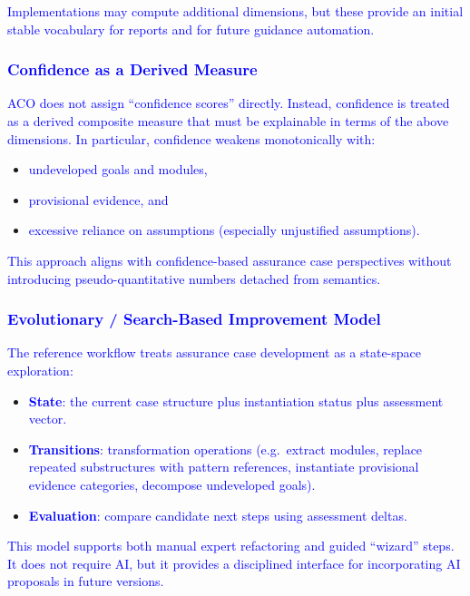 \documentclass[11pt]{article}
\begin{document}
\textcolor{blue}{Implementations may compute additional dimensions, but these provide an initial stable vocabulary for reports and for future guidance automation.}

\subsubsection{\textcolor{blue}{Confidence as a Derived Measure}}

\textcolor{blue}{ACO does not assign ``confidence scores'' directly. Instead, confidence is treated as a derived composite measure that must be explainable in terms of the above dimensions. In particular, confidence weakens monotonically with:}
\begin{itemize}[leftmargin=2em]
  \item \textcolor{blue}{undeveloped goals and modules,}
  \item \textcolor{blue}{provisional evidence, and}
  \item \textcolor{blue}{excessive reliance on assumptions (especially unjustified assumptions).}
\end{itemize}

\textcolor{blue}{This approach aligns with confidence-based assurance case perspectives without introducing pseudo-quantitative numbers detached from semantics.}

\subsubsection{\textcolor{blue}{Evolutionary / Search-Based Improvement Model}}

\textcolor{blue}{The reference workflow treats assurance case development as a state-space exploration:}
\begin{itemize}[leftmargin=2em]
  \item \textcolor{blue}{\textbf{State}: the current case structure plus instantiation status plus assessment vector.}
  \item \textcolor{blue}{\textbf{Transitions}: transformation operations (e.g.\ extract modules, replace repeated substructures with pattern references, instantiate provisional evidence categories, decompose undeveloped goals).}
  \item \textcolor{blue}{\textbf{Evaluation}: compare candidate next steps using assessment deltas.}
\end{itemize}

\textcolor{blue}{This model supports both manual expert refactoring and guided ``wizard'' steps. It does not require AI, but it provides a disciplined interface for incorporating AI proposals in future versions.}
\end{document}
